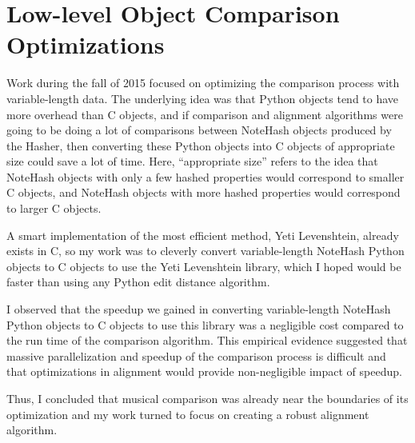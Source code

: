 \section{Low-level Object Comparison Optimizations} \label{spaceoptimizations}
Work during the fall of 2015 focused on optimizing the comparison process with variable-length data. The underlying idea was that Python objects tend to have more overhead than C objects, and if comparison and alignment algorithms were going to be doing a lot of comparisons between NoteHash objects produced by the Hasher, then converting these Python objects into C objects of appropriate size could save a lot of time. Here, ``appropriate size'' refers to the idea that NoteHash objects with only a few hashed properties would correspond to smaller C objects, and NoteHash objects with more hashed properties would correspond to larger C objects. 

A smart implementation of the most efficient method, Yeti Levenshtein, already exists in C, so my work was to cleverly convert variable-length NoteHash Python objects to C objects to use the Yeti Levenshtein library, which I hoped would be faster than using any Python edit distance algorithm.

I observed that the speedup we gained in converting variable-length NoteHash Python objects to C objects to use this library was a negligible cost compared to the run time of the comparison algorithm. This empirical evidence suggested that massive parallelization and speedup of the comparison process is difficult and that optimizations in alignment would provide non-negligible impact of speedup.

Thus, I concluded that musical comparison was already near the boundaries of its optimization and my work turned to focus on creating a robust alignment algorithm. 
